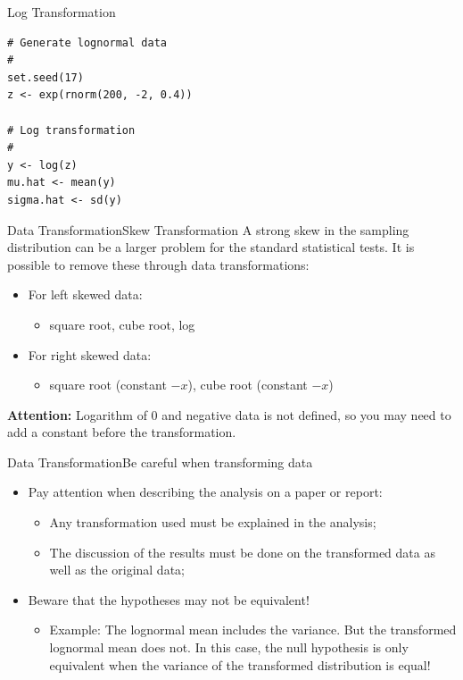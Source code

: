 \begin{frame}[fragile]{Log Transformation}{}
\begin{verbatim}
# Generate lognormal data
#
set.seed(17)
z <- exp(rnorm(200, -2, 0.4))

# Log transformation
#
y <- log(z)
mu.hat <- mean(y)
sigma.hat <- sd(y)
\end{verbatim}
\end{frame}

\begin{frame}{Data Transformation}{Skew Transformation}
  A strong skew in the sampling distribution can be a larger problem for the standard statistical tests. It is possible to remove these through data transformations:\bigskip

  \begin{itemize}
    \item For left skewed data:
    \begin{itemize}
      \item square root, cube root, log
    \end{itemize}
    \item For right skewed data:
    \begin{itemize}
      \item square root (constant $-x$), cube root (constant $-x$)
    \end{itemize}
  \end{itemize}\bigskip

  {\bf Attention:} Logarithm of 0 and negative data is not defined, so you may need to add a constant before the transformation.
\end{frame}



\begin{frame}{Data Transformation}{Be careful when transforming data}
  \begin{itemize}
    \item Pay attention when describing the analysis on a paper or report:
    \begin{itemize}
      \item Any transformation used must be explained in the analysis;
      \item The discussion of the results must be done on the transformed data as well as the original data;
    \end{itemize}\bigskip

    \item Beware that the hypotheses may not be equivalent!
    \begin{itemize}
      \item Example: The lognormal mean includes the variance. But the transformed lognormal mean does not. In this case, the null hypothesis is only equivalent when the variance of the transformed distribution is equal!
    \end{itemize}
  \end{itemize}
\end{frame}

